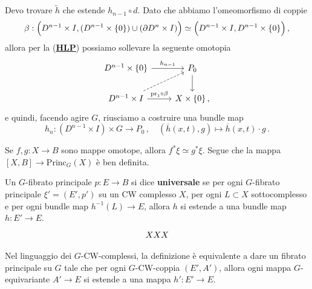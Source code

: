 Devo trovare $\widetilde{h}$ che estende $h_{n-1} \circ d$.
Dato che abbiamo l'omeomorfismo di coppie
\begin{equation*}
	\beta: \Big(D^{n-1} \times I , (D^{n-1} \times \{0\}) \cup (\partial D^{n} \times I) \Big) 
	\simeq \Big(D^{n-1} \times I, D^{n-1} \times \{0\} \Big)\,,
\end{equation*}
allora per la (\hyperref[HLP]{\textbf{HLP}}) possiamo sollevare la seguente omotopia
\begin{equation*}
	\begin{tikzcd}
		D^{n-1} \times \{0\} \ar[r, "h_{n-1}"]
		& P_{0} \ar[d] \\
		D^{n-1} \times I \ar[r, "\mathrm{pr}_{1} \circ \beta"] \ar[ur, dashed]
		& X \times \{0\}\,, 
	\end{tikzcd}
\end{equation*}
e quindi, facendo agire $G$, riusciamo a costruire una bundle map 
\begin{equation*}
	h_{n} : (D^{n-1} \times I) \times G \longrightarrow P_{0}\,,
	\quad \left(\overline{h}(x,t),g \right) \longmapsto \overline{h}(x,t) \cdot g\,.
\end{equation*}

\begin{cor}
	Se $f,g : X \to B$ sono mappe omotope, allora $f^{*}\xi \simeq g^{*}\xi$.
	Segue che la mappa $[X,B] \to \mathrm{Princ}_{G}(X)$ è ben definita.
\end{cor}

\begin{df}
	Un $G$-fibrato principale $p:E \to B$ si dice \textbf{universale} 
	se per ogni $G$-fibrato principale $\xi' = (E',p')$ su un CW complesso $X$,
	per ogni $L \subset X$ sottocomplesso e per ogni bundle map $h^{-1}(L) \to E$,
	allora $h$ si estende a una bundle map $h:E' \to E$.
	\begin{equation*}
		\begin{tikzcd}
			XXX
		\end{tikzcd}
	\end{equation*}
\end{df}

Nel linguaggio dei $G$-CW-complessi, la definizione è equivalente a
dare un fibrato principale su $G$ tale che per ogni $G$-CW-coppia $(E',A')$,
allora ogni mappa $G$-equivariante $A' \to E$ si estende a una mappa $h':E' \to E$.

